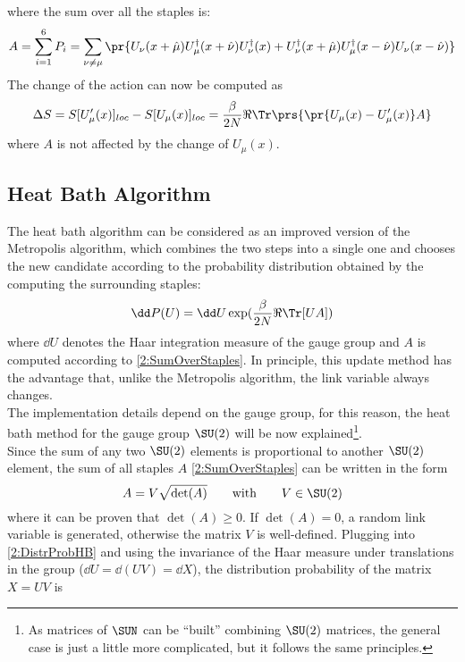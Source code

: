 where the sum over all the staples is:
\begin{equation}
    A = \sum_{i=1}^6P_i = \sum_{\nu\neq\mu}\pr{U_\nu(x+\hat\mu)U^\dagger_\mu(x+\hat\nu)U^\dagger_\nu(x) + U^\dagger_\nu(x+\hat\mu)U^\dagger_\mu(x-\hat\nu)U_\nu(x-\hat\nu)} \label{2:SumOverStaples}
\end{equation}
The change of the action can now be computed as
\begin{equation}
    \Delta S = S[U'_\mu(x)]_{loc}-S[U_\mu(x)]_{loc} = \frac\beta{2N} \Re\Tr\prs{\pr{U_\mu(x)-U'_\mu(x)}A} \label{2:MetropolisActionVar}
\end{equation}
where $A$ is not affected by the change of $U_\mu(x)$.

\subsection{Heat Bath Algorithm}
The heat bath algorithm can be considered as an improved version of the Metropolis algorithm, which combines the two steps into a single one and chooses the new candidate according to the probability distribution obtained by the computing the surrounding staples:
\begin{equation}
    \dd P(U) = \dd U \exp(\frac\beta{2N}\Re\Tr[U A]) \label{2:DistrProbHB}
\end{equation}
where $\dd U$ denotes the Haar integration measure of the gauge group and $A$ is computed according to \eqref{2:SumOverStaples}.
In principle, this update method 
has the advantage that, unlike the Metropolis algorithm, the link variable always changes.\\
The implementation details depend on the gauge group, for this reason, the heat bath method for the gauge group $\SU(2)$ will be now explained\footnote{As matrices of $\SUN$ can be ``built'' combining $\SU(2)$ matrices, the general case is just a little more complicated, but it follows the same principles.}.\\
Since the sum of any two $\SU(2)$ elements is proportional to another $\SU(2)$ element, the sum of all staples $A$ \eqref{2:SumOverStaples} can be written in the form
\begin{equation}
    A = V\sqrt{\det(A)} \qquad\text{with}\qquad V\in\SU(2) \label{2:SumOverStaplesSU2}
\end{equation}
where it can be proven that $\det(A)\geq0$.
If $\det(A)=0$, a random link variable is generated, otherwise the matrix $V$ is well-defined.
Plugging into \eqref{2:DistrProbHB} and using the invariance of the Haar measure under translations in the group ($\dd U = \dd (UV) = \dd X$), the distribution probability of the matrix $X=UV$ is
